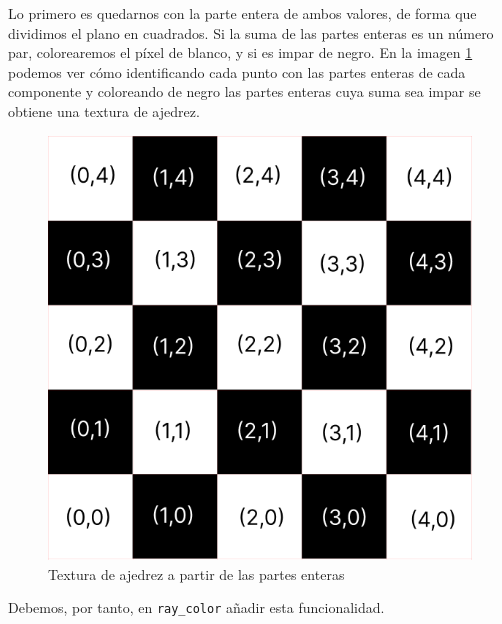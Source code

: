 Lo primero es quedarnos con la parte entera de ambos valores, de forma que dividimos el plano en cuadrados. Si la suma de las partes enteras es un número par, colorearemos el píxel de blanco, y si es impar de negro. En la imagen \ref{fig:ajedrez} podemos ver cómo identificando cada punto con las partes enteras de cada componente y coloreando de negro las partes enteras cuya suma sea impar se obtiene una textura de ajedrez.

\begin{figure} [ht]
    \centering
    \includegraphics[scale = 0.25]{img/C7/ajedrez.png}
    \caption{Textura de ajedrez a partir de las partes enteras}
    \label{fig:ajedrez}
\end{figure}

Debemos, por tanto, en \verb|ray_color| añadir esta funcionalidad.

